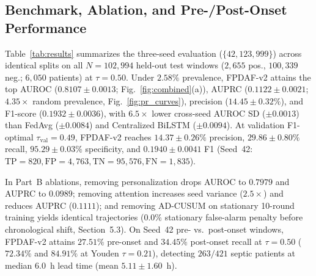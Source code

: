 \documentclass{llncs}
\begin{document}
\subsection{Benchmark, Ablation, and Pre-/Post-Onset Performance}

Table~\ref{tab:results} summarizes the three-seed evaluation ($\{42,123,999\}$) across identical splits on all $N=102{,}994$ held-out test windows ($2{,}655$ pos., $100{,}339$ neg.; $6{,}050$ patients) at $\tau=0.50$. Under $2.58\%$ prevalence, FPDAF-v2 attains the top AUROC ($0.8107\pm 0.0013$; Fig.~\ref{fig:combined}(a)), AUPRC ($0.1122\pm 0.0021$; $4.35\times$ random prevalence, Fig.~\ref{fig:pr_curves}), precision ($14.45\pm 0.32\%$), and F1-score ($0.1932\pm 0.0036$), with $6.5\times$ lower cross-seed AUROC SD ($\pm 0.0013$) than FedAvg ($\pm 0.0084$) and Centralized BiLSTM ($\pm 0.0094$). At validation F1-optimal $\tau_{\mathrm{val}}=0.49$, FPDAF-v2 reaches $14.37\pm 0.26\%$ precision, $29.86\pm 0.80\%$ recall, $95.29\pm 0.03\%$ specificity, and $0.1940\pm 0.0041$ F1 (Seed~42: $\mathrm{TP}=820, \mathrm{FP}=4{,}763, \mathrm{TN}=95{,}576, \mathrm{FN}=1{,}835$).

In Part~B ablations, removing personalization drops AUROC to $0.7979$ and AUPRC to $0.0989$; removing attention increases seed variance ($2.5\times$) and reduces AUPRC ($0.1111$); and removing AD-CUSUM on stationary 10-round training yields identical trajectories ($0.0\%$ stationary false-alarm penalty before chronological shift, Section~5.3). On Seed~42 pre- vs.\ post-onset windows, FPDAF-v2 attains $27.51\%$ pre-onset and $34.45\%$ post-onset recall at $\tau=0.50$ ($72.34\%$ and $84.91\%$ at Youden $\tau=0.21$), detecting $263/421$ septic patients at median $6.0$~h lead time (mean $5.11\pm 1.60$~h).
\end{document}
